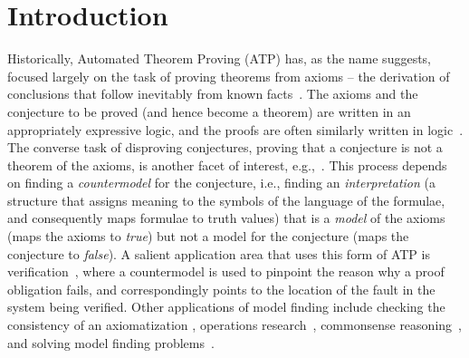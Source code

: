 \documentclass{ceurart}
\begin{document}
\maketitle
\section{Introduction}
\label{Introduction}

Historically, Automated Theorem Proving (ATP) has, as the name suggests, focused largely on the
task of proving theorems from axioms -- the derivation of conclusions that follow inevitably 
from known facts~\cite{RV01-HAR}.
The axioms and the conjecture to be proved (and hence become a theorem) are written in an 
appropriately expressive logic, and the proofs are often similarly written in logic~\cite{SS+06}.
The converse task of disproving conjectures, proving that a conjecture is not a theorem of the 
axioms, is another facet of interest, e.g.,~\cite{Win82,LM87,McC98,Zha05,BN10-ITP,RKK17,EPS24}.
This process depends on finding a \emph{countermodel} for the conjecture, i.e., finding an 
\emph{interpretation} (a structure that assigns meaning to the symbols of the language of the
formulae, and consequently maps formulae to truth values) that is a \emph{model} of the axioms 
(maps the axioms to \textit{true}) but not a model for the conjecture (maps the conjecture to 
\textit{false}).
A salient application area that uses this form of ATP is verification~\cite{DKW08}, where a 
countermodel is used to pinpoint the reason why a proof obligation fails, and correspondingly 
points to the location of the fault in the system being verified.
Other applications of model finding include checking the consistency of an axiomatization 
\cite{SS+17}, operations research~\cite{Hoo93}, commonsense reasoning~\cite{KR94}, and solving 
model finding problems~\cite{Win82}.
\end{document}
